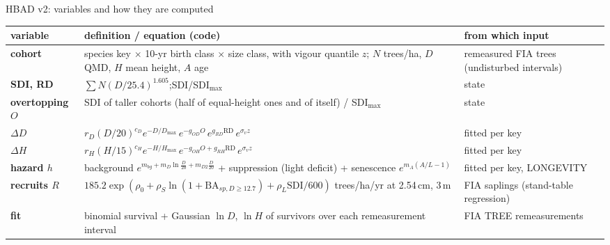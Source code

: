 \begin{frame}{HBAD v2: variables and how they are computed}
\scriptsize
\renewcommand{\arraystretch}{1.07}
\begin{tabularx}{\textwidth}{@{}>{\bfseries}p{2.3cm}X>{\raggedright\arraybackslash}p{3.9cm}@{}}
\toprule
variable & definition / equation (code) & from which input \\
\midrule
cohort & species key $\times$ 10-yr birth class $\times$ size class, with vigour quantile $z$; $N$ trees/ha, $D$ QMD, $H$ mean height, $A$ age & remeasured FIA trees (undisturbed intervals) \\
SDI, RD & $\sum N(D/25.4)^{1.605}$;\quad SDI/SDI$_{\max}$ & state \\
overtopping $O$ & SDI of taller cohorts (half of equal-height ones and of itself) / SDI$_{\max}$ & state \\
$\Delta D$ & $r_D(D/20)^{c_D}e^{-D/D_{\max}}\,e^{-g_{OD}O}\,e^{g_{RD}\text{RD}}\,e^{\sigma_vz}$ & fitted per key \\
$\Delta H$ & $r_H(H/15)^{c_H}e^{-H/H_{\max}}\,e^{-g_{OH}O+g_{RH}\text{RD}}\,e^{\sigma_vz}$ & fitted per key \\
hazard $h$ & background $e^{m_{bg}+m_D\ln\frac D{20}+m_{D2}\frac D{20}}$ + suppression (light deficit) + senescence $e^{m_A(A/L-1)}$ & fitted per key, LONGEVITY \\
recruits $R$ & $185.2\exp(\rho_0+\rho_S\ln(1+\text{BA}_{sp,D\ge12.7})+\rho_L\text{SDI}/600)$ trees/ha/yr at 2.54\,cm, 3\,m & FIA saplings (stand-table regression) \\
fit & binomial survival + Gaussian $\ln D$, $\ln H$ of survivors over each remeasurement interval & FIA TREE remeasurements \\
\bottomrule
\end{tabularx}
\end{frame}
